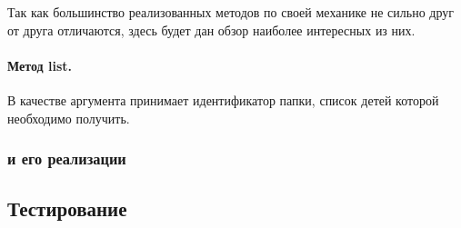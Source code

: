        Так как большинство реализованных методов по своей механике не сильно друг от друга отличаются, здесь будет дан обзор наиболее интересных из них. 

        \paragraph{Метод list.} В качестве аргумента принимает идентификатор папки, список детей которой необходимо получить. 


    \subsubsection{ и его реализации}

        

\subsection{}


\subsection{Тестирование}

    

